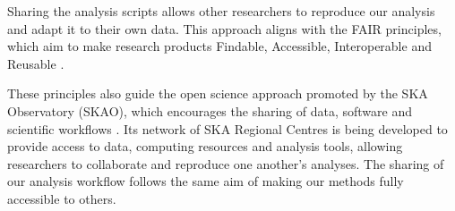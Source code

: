 Sharing the analysis scripts allows other researchers to reproduce our analysis and adapt it to their own data. This approach aligns with the FAIR principles, which aim to make research products Findable, Accessible, Interoperable and Reusable \citep{Wilkinson2016}.

These principles also guide the open science approach promoted by the SKA Observatory (SKAO), which encourages the sharing of data, software and scientific workflows \citep{SKAOOpenScience}. Its network of SKA Regional Centres is being developed to provide access to data, computing resources and analysis tools, allowing researchers to collaborate and reproduce one another's analyses. The sharing of our analysis workflow follows the same aim of making our methods fully accessible to others.
\newpage
